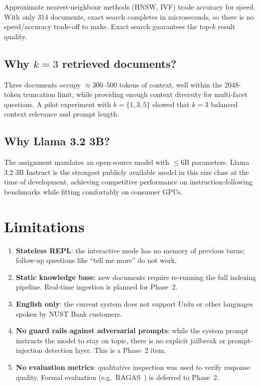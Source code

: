 \documentclass[12pt,a4paper]{article}
\begin{document}
Approximate nearest-neighbour methods (HNSW, IVF) trade accuracy for speed.
With only 314 documents, exact search completes in microseconds, so there is no
speed/accuracy trade-off to make.  Exact search guarantees the top-$k$ result
quality.

\subsection{Why $k=3$ retrieved documents?}

Three documents occupy $\approx$300--500 tokens of context, well within the
2048-token truncation limit, while providing enough context diversity for
multi-facet questions.  A pilot experiment with $k=\{1,3,5\}$ showed that $k=3$
balanced context relevance and prompt length.

\subsection{Why Llama 3.2 3B?}

The assignment mandates an open-source model with $\leq$6B parameters.  Llama 3.2
3B Instruct is the strongest publicly available model in this size class at the
time of development, achieving competitive performance on instruction-following
benchmarks while fitting comfortably on consumer GPUs.

\section{Limitations}

\begin{enumerate}[leftmargin=2em]
  \item \textbf{Stateless REPL}: the interactive mode has no memory of previous
        turns; follow-up questions like ``tell me more'' do not work.
  \item \textbf{Static knowledge base}: new documents require re-running the
        full indexing pipeline.  Real-time ingestion is planned for Phase~2.
  \item \textbf{English only}: the current system does not support Urdu or other
        languages spoken by NUST Bank customers.
  \item \textbf{No guard rails against adversarial prompts}: while the system
        prompt instructs the model to stay on topic, there is no explicit
        jailbreak or prompt-injection detection layer.  This is a Phase~2 item.
  \item \textbf{No evaluation metrics}: qualitative inspection was used to verify
        response quality.  Formal evaluation (e.g.\ RAGAS~\cite{es2023ragas})
        is deferred to Phase~2.
\end{enumerate}
\end{document}
